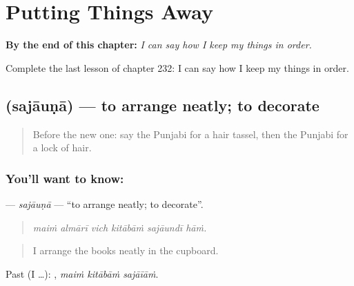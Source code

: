 
\chapter{Putting Things Away}
\label{ch:pa-a2-putting-things-away}

\begin{chapteropening}
\textbf{By the end of this chapter:} \emph{I can say how I keep my things in order.}

Complete the last lesson of chapter 232: I can say how I keep my things in order.
\end{chapteropening}

\section[\texorpdfstring{\pa{ਸਜਾਉਣਾ} (sajāuṇā)}{ਸਜਾਉਣਾ (sajāuṇā)}]{ (sajāuṇā) — to arrange neatly; to decorate}

\label{lesson:PA-C232-sajauna}



\begin{quote}
Before the new one: say the Punjabi for a hair tassel, then the Punjabi for a lock of hair.
\end{quote}

\subsection*{You'll want to know: }
\textbf{} — \emph{sajāuṇā} — \textquotedblleft{}to arrange neatly; to decorate\textquotedblright{}.

\begin{quote}
     
\end{quote}

\begin{quote}
\emph{maiṁ almārī vich kitābāṁ sajāundī hāṁ.}
\end{quote}

\begin{quote}
I arrange the books neatly in the cupboard.
\end{quote}

Past (I …):   , \emph{maiṁ kitābāṁ sajāīāṁ}.

